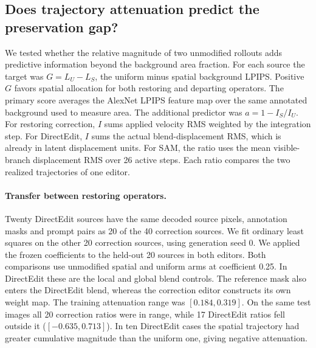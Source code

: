 \subsection{Does trajectory attenuation predict the preservation gap?}
\label{sec:v21-transfer}
We tested whether the relative magnitude of two unmodified rollouts adds predictive information beyond the background area fraction. For each source the target was $G=L_U-L_S$, the uniform minus spatial background LPIPS. Positive $G$ favors spatial allocation for both restoring and departing operators. The primary score averages the AlexNet LPIPS feature map over the same annotated background used to measure area. The additional predictor was $a=1-I_S/I_U$. For restoring correction, $I$ sums applied velocity RMS weighted by the integration step. For DirectEdit, $I$ sums the actual blend-displacement RMS, which is already in latent displacement units. For SAM, the ratio uses the mean visible-branch displacement RMS over 26 active steps. Each ratio compares the two realized trajectories of one editor.

\paragraph{Transfer between restoring operators.}
Twenty DirectEdit sources have the same decoded source pixels, annotation masks and prompt pairs as 20 of the 40 correction sources. We fit ordinary least squares on the other 20 correction sources, using generation seed 0. We applied the frozen coefficients to the held-out 20 sources in both editors. Both comparisons use unmodified spatial and uniform arms at coefficient 0.25. In DirectEdit these are the local and global blend controls. The reference mask also enters the DirectEdit blend, whereas the correction editor constructs its own weight map. The training attenuation range was $[0.184,0.319]$. On the same test images all 20 correction ratios were in range, while 17 DirectEdit ratios fell outside it ($[-0.635,0.713]$). In ten DirectEdit cases the spatial trajectory had greater cumulative magnitude than the uniform one, giving negative attenuation.

